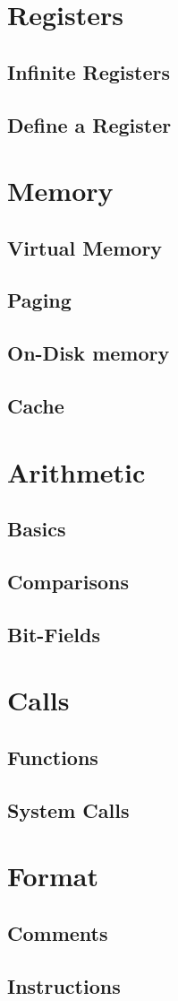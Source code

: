 \documentclass{scrartcl}
\begin{document}
    \section{Registers}
        \subsection{Infinite Registers}
        \subsection{Define a Register}
    \section{Memory}
        \subsection{Virtual Memory}
        \subsection{Paging}
        \subsection{On-Disk memory}
        \subsection{Cache}
    \section{Arithmetic}
        \subsection{Basics}
        \subsection{Comparisons}
        \subsection{Bit-Fields}
    \section{Calls}
        \subsection{Functions}
        \subsection{System Calls}
    \section{Format}
        \subsection{Comments}
        \subsection{Instructions}
\end{document}
